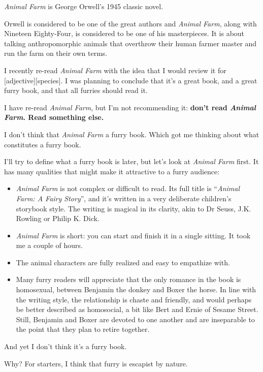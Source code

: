 
\textit{Animal Farm} is George Orwell's 1945 classic novel.

Orwell is considered to be one of the great authors and \textit{Animal Farm}, along with Nineteen Eighty-Four, is considered to be one of his masterpieces. It is about talking anthropomorphic animals that overthrow their human farmer master and run the farm on their own terms.

I recently re-read \textit{Animal Farm} with the idea that I would review it for [adjective][species]. I was planning to conclude that it's a great book, and a great furry book, and that all furries should read it.

I have re-read \textit{Animal Farm}, but I'm not recommending it: \textbf{don't read \textit{Animal Farm}. Read something else.}

I don't think that \textit{Animal Farm} a furry book. Which got me thinking about what constitutes a furry book.

I'll try to define what a furry book is later, but let's look at \textit{Animal Farm} first. It has many qualities that might make it attractive to a furry audience:

\begin{itemize}
  \item \textit{Animal Farm} is not complex or difficult to read. Its full title is ``\textit{Animal Farm: A Fairy Story}'', and it's written in a very deliberate children's storybook style. The writing is magical in its clarity, akin to Dr Seuss, J.K. Rowling or Philip K. Dick.
  \item \textit{Animal Farm} is short: you can start and finish it in a single sitting. It took me a couple of hours.
  \item The animal characters are fully realized and easy to empathize with.
  \item Many furry readers will appreciate that the only romance in the book is homosexual, between Benjamin the donkey and Boxer the horse. In line with the writing style, the relationship is chaste and friendly, and would perhaps be better described as homosocial, a bit like Bert and Ernie of Sesame Street. Still, Benjamin and Boxer are devoted to one another and are inseparable to the point that they plan to retire together.
\end{itemize}

And yet I don't think it's a furry book.

Why? For starters, I think that furry is escapist by nature.

